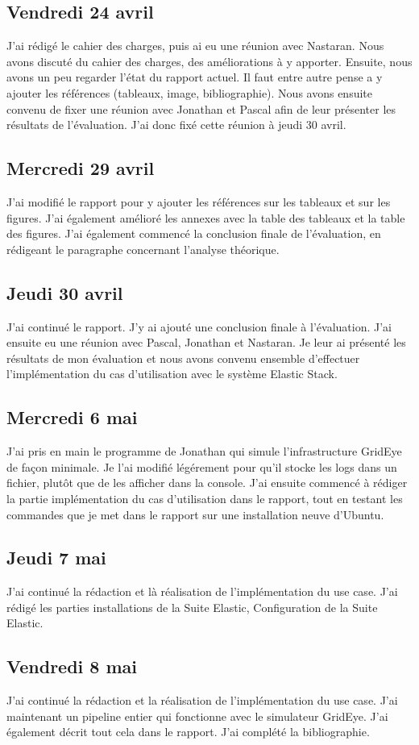 \documentclass[paper=a4, fontsize=11pt]{scrartcl}
\begin{document}
\subsection{Vendredi 24 avril}
    J'ai rédigé le cahier des charges, puis ai eu une réunion avec Nastaran. Nous avons discuté du cahier des charges, des améliorations à y apporter. Ensuite, nous avons un peu regarder l'état du rapport actuel. Il faut entre autre pense a y ajouter les références (tableaux, image, bibliographie). Nous avons ensuite convenu de fixer une réunion avec Jonathan et Pascal afin de leur présenter les résultats de l'évaluation. J'ai donc fixé cette réunion à jeudi 30 avril.
\subsection{Mercredi 29 avril}
    J'ai modifié le rapport pour y ajouter les références sur les tableaux et sur les figures. J'ai également amélioré les annexes avec la table des tableaux et la table des figures. J'ai également commencé la conclusion finale de l'évaluation, en rédigeant le paragraphe concernant l'analyse théorique.
\subsection{Jeudi 30 avril}
    J'ai continué le rapport. J'y ai ajouté une conclusion finale à l'évaluation. J'ai ensuite eu une réunion avec Pascal, Jonathan et Nastaran. Je leur ai présenté les résultats de mon évaluation et nous avons convenu ensemble d'effectuer l'implémentation du cas d'utilisation avec le système Elastic Stack.
\subsection{Mercredi 6 mai}
    J'ai pris en main le programme de Jonathan qui simule l'infrastructure GridEye de façon minimale. Je l'ai modifié légérement pour qu'il stocke les logs dans un fichier, plutôt que de les afficher dans la console. J'ai ensuite commencé à rédiger la partie implémentation du cas d'utilisation dans le rapport, tout en testant les commandes que je met dans le rapport sur une installation neuve d'Ubuntu.
\subsection{Jeudi 7 mai}
    J'ai continué la rédaction et là réalisation de l'implémentation du use case. J'ai rédigé les parties installations de la Suite Elastic, Configuration de la Suite Elastic.
\subsection{Vendredi 8 mai}
    J'ai continué la rédaction et la réalisation de l'implémentation du use case. J'ai maintenant un pipeline entier qui fonctionne avec le simulateur GridEye. J'ai également décrit tout cela dans le rapport. J'ai complété la bibliographie.
\end{document}
